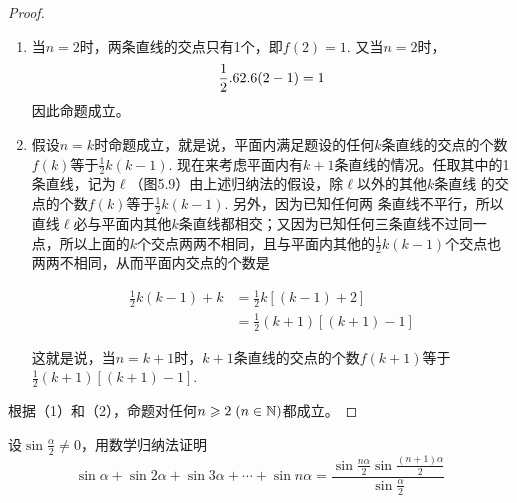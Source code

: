 \begin{proof}
\begin{enumerate}[(1)]
    \item 当$n=2$时，两条直线的交点只有1个，即$f(2)=1$. 又当$n=2$时，
\[\dfrac{1}{2}.62.6(2-1)=1\]
因此命题成立。

\item 假设$n=k$时命题成立，就是说，平面内满足题设的任何$k$条直线的交点的个数$f(k)$等于$\frac{1}{2}k(k-1)$. 现在来考虑平面内有$k+1$条直线的情况。任取其中的1条直线，记为$\ell$（图5.9）由上述归纳法的假设，除$\ell$以外的其他$k$条直线
的交点的个数$f(k)$等于$\frac{1}{2}k(k-1)$. 另外，因为已知任何两
条直线不平行，所以直线$\ell$必与平面内其他$k$条直线都相交；又因为已知任何三条直线不过同一点，所以上面的$k$个交点两两不相同，且与平面内其他的$\frac{1}{2}k(k-1)$个交点也两两不相同，从而平面内交点的个数是

\noindent
\begin{minipage}{.47\textwidth}\CTEXindent
\[\begin{split}
    \frac{1}{2}k(k-1)+k&=\frac{1}{2}k[(k-1)+2]\\
    &=\frac{1}{2}(k+1)[(k+1)-1]
\end{split}\]

这就是说，当$n=k+1$时，$k+1$条直线的交点的个数$f(k+1)$等于$\frac{1}{2}(k+1)[(k+1)-1]$.    
\end{minipage}\hfill
\begin{minipage}{.45\textwidth}
\centering
{}
\end{minipage}
\end{enumerate}

根据（1）和（2），命题对任何$n\geqslant 2\; (n\in\mathbb{N})$都成立。
\end{proof}

\begin{example}
设$\sin\frac{\alpha}{2}\ne 0$，用数学归纳法证明
\[\sin\alpha+\sin2\alpha+\sin3\alpha+\cdots+\sin n\alpha=\frac{\sin\frac{n\alpha}{2}\sin\frac{(n+1)\alpha}{2}}{\sin\frac{\alpha}{2}}\]
\end{example}

